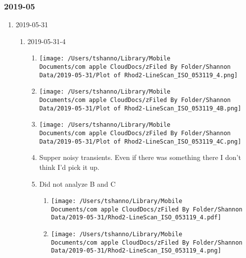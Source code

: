 \documentclass[11pt]{article}
\begin{document}
\subsubsection{2019-05}
\label{sec:orgb39e4d3}
\begin{enumerate}
\item 2019-05-31
\label{sec:orga8200bf}
\begin{enumerate}
\item 2019-05-31-4
\label{sec:orgdfd5a17}
\begin{enumerate}
\item \begin{center}
\texttt{[image: /Users/tshanno/Library/Mobile Documents/com~apple~CloudDocs/zFiled By Folder/Shannon Data/2019-05-31/Plot of Rhod2-LineScan\_ISO\_053119\_4.png]}
\end{center}
\label{sec:org64db814}
\item \begin{center}
\texttt{[image: /Users/tshanno/Library/Mobile Documents/com~apple~CloudDocs/zFiled By Folder/Shannon Data/2019-05-31/Plot of Rhod2-LineScan\_ISO\_053119\_4B.png]}
\end{center}
\label{sec:org165647f}
\item \begin{center}
\texttt{[image: /Users/tshanno/Library/Mobile Documents/com~apple~CloudDocs/zFiled By Folder/Shannon Data/2019-05-31/Plot of Rhod2-LineScan\_ISO\_053119\_4C.png]}
\end{center}
\label{sec:orga5aa629}
\item Supper noisy transients.  Even if there was something there I don't think I'd pick it up.
\label{sec:org85631c6}
\item Did not analyze B and C
\label{sec:orge971864}
\begin{enumerate}
\item \begin{center}
\texttt{[image: /Users/tshanno/Library/Mobile Documents/com~apple~CloudDocs/zFiled By Folder/Shannon Data/2019-05-31/Rhod2-LineScan\_ISO\_053119\_4.pdf]}
\end{center}
\label{sec:org3c93e00}
\item \begin{center}
\texttt{[image: /Users/tshanno/Library/Mobile Documents/com~apple~CloudDocs/zFiled By Folder/Shannon Data/2019-05-31/Rhod2-LineScan\_ISO\_053119\_4.png]}
\end{center}
\label{sec:orgd81ee98}

\end{enumerate}
\end{enumerate}
\end{enumerate}
\end{enumerate}
\end{document}
